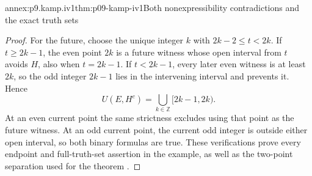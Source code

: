 \begin{annexitem}{annex:p9.kamp.iv1}{thm:p09-kamp-iv1}{Both nonexpressibility contradictions and the exact truth sets}
\begin{proof}
For the future, choose the unique integer \(k\) with
\(2k-2\leq t<2k\). If \(t\geq2k-1\), the even
point \(2k\) is a future witness whose open interval
from \(t\) avoids \(H\), also when \(t=2k-1\).
If \(t<2k-1\), every later even witness is at least
\(2k\), so the odd integer \(2k-1\) lies in the
intervening interval and prevents it. Hence
\[
                         U(E,H^c)=
                       \bigcup_{k\in\mathbb Z}[2k-1,2k).
\]
At an even current point the same strictness excludes using
that point as the future witness. At an odd current point,
the current odd integer is outside either open interval, so
both binary formulas are true. These verifications prove every
endpoint and full-truth-set assertion in the example, as well
as the two-point separation used for the theorem
\cite[ch.~IV, thm.~1, pp.~95--99]{Kamp1968}.
\end{proof}
\end{annexitem}
